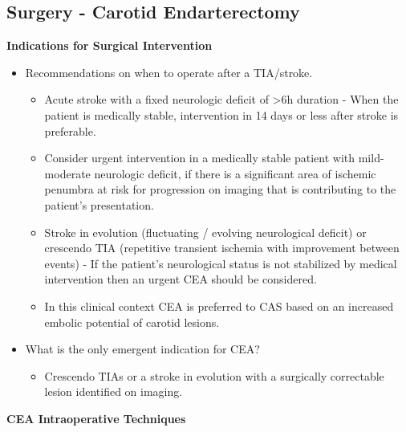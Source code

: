 \documentclass[
]{book}
\providecommand{\tightlist}{%
  \setlength{\itemsep}{0pt}\setlength{\parskip}{0pt}}
\begin{document}
\hypertarget{surgery---carotid-endarterectomy}{%
\subsection{Surgery - Carotid Endarterectomy}\label{surgery---carotid-endarterectomy}}

\textbf{Indications for Surgical Intervention}

\begin{itemize}
\item
  Recommendations on when to operate after a TIA/stroke.

  \begin{itemize}
  \item
    Acute stroke with a fixed neurologic deficit of \textgreater6h duration -
    When the patient is medically stable, intervention in 14 days or
    less after stroke is preferable.
    \citep{rothwellEndarterectomySymptomaticCarotid2004, meershoekTimingCarotidIntervention2018}
  \item
    Consider urgent intervention in a medically stable patient with
    mild-moderate neurologic deficit, if there is a significant area
    of ischemic penumbra at risk for progression on imaging that is
    contributing to the patient's presentation.
  \item
    Stroke in evolution (fluctuating / evolving neurological
    deficit) or crescendo TIA (repetitive transient ischemia with
    improvement between events) - If the patient's neurological
    status is not stabilized by medical intervention then an urgent
    CEA should be considered.
  \item
    In this clinical context CEA is preferred to CAS based on an
    increased embolic potential of carotid lesions.
    \citep{rantnerEarlyEndarterectomyCarries2017}
  \end{itemize}
\item
  What is the only emergent indication for CEA?

  \begin{itemize}
  \tightlist
  \item
    Crescendo TIAs or a stroke in evolution with a surgically
    correctable lesion identified on imaging.
  \end{itemize}
\end{itemize}

\textbf{CEA Intraoperative Techniques}
\end{document}
